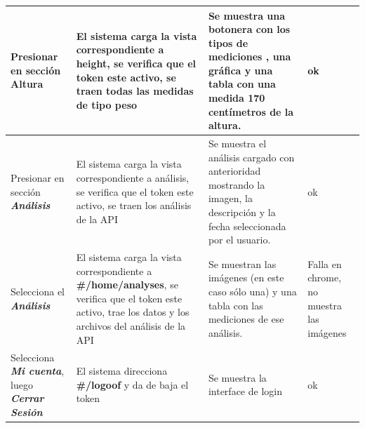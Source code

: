 {\begin{longtable}{|p{4cm}|p{4cm}|p{4cm}|p{3cm}|}
  						
  						
  						
  						Presionar en sección \textbf{Altura }
  						& El sistema carga la vista correspondiente a height, se verifica que el token este activo, se traen todas las medidas de tipo peso
  						& Se muestra una botonera con los tipos de mediciones , una gráfica y una tabla con una medida \textbf{170 centímetros} de la altura.
  						& ok
  						\\ \hline
  						
  						
  						
  						
  						
  						Presionar en sección \textit{\textbf{Análisis }} 
  						& El sistema carga la vista correspondiente a análisis, se verifica que el token este activo, se traen los análisis de la API
  						& Se muestra el análisis cargado con anterioridad mostrando la imagen, la descripción y la fecha seleccionada por el usuario.
  						& ok
  						\\ \hline
  						
  						
  						
  						
  						
  						
  						Selecciona el \textit{\textbf{Análisis}}
  						& El sistema carga la vista correspondiente a \textbf{ \#/home/analyses}, se verifica que el token este activo, trae los datos y los archivos del análisis de la API
  						& Se muestran las imágenes (en este caso sólo una) y una tabla con las mediciones de ese análisis.
  						& Falla en chrome, no muestra las imágenes
  						\\ \hline
  						
  						
  						
  						
  						Selecciona \textit{\textbf{Mi cuenta}}, luego \textit{\textbf{Cerrar Sesión}}
  						& El sistema direcciona \textbf{\#/logoof } y da de baja el token
  						& Se muestra la interface de login
  						& ok
  						\\ \hline
  						
  						
  					\end{longtable}
  					
  				}
  					
 
